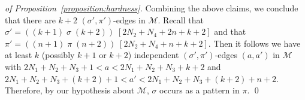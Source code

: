 \documentclass[a4paper]{llncs}
\begin{document}
\begin{proof}[of Proposition~\ref{proposition:hardness}]
  Combining the above claims, we conclude that there are
  $k+2$ $(\sigma', \pi')$-edges in $\mathcal{M}$.
  Recall that
  $\sigma' = ((k+1) \; \sigma \; (k+2)) \; [2N_2 + N_4 + 2n + k + 2]$ and that
  $\pi' = ((n+1) \; \pi \; (n+2)) \; [2N_2 + N_4 + n + k + 2]$.
  Then it follows we have
  at least $k$ (possibly $k+1$ or $k+2$) independent $(\sigma', \pi')$-edges
  $(a, a')$ in $\mathcal{M}$ with
  $2N_1 + N_2 + N_3 + 1 < a < 2N_1 + N_2 + N_3 + k + 2$
  and
  $2N_1 + N_2 + N_3 + (k + 2) + 1 < a' < 2N_1 + N_2 + N_3 + (k + 2) + n + 2$.
  Therefore, by our hypothesis about $\mathcal{M}$,
  $\sigma$ occurs as a pattern in $\pi$.
  \qed
\end{proof}


%
%
%
%
\end{document}
